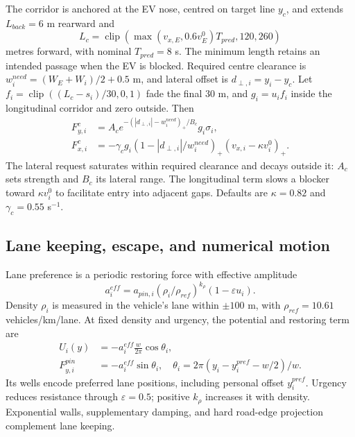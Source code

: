 \documentclass[conference,a4paper]{IEEEtran}
\newcommand{\pos}[1]{\left(#1\right)_+}
\newcommand{\clip}{\operatorname{clip}}
\begin{document}
The corridor is anchored at the EV nose, centred on target line $y_c$, and extends $L_{back}=6$ m rearward and
\begin{equation}
L_c=\clip(\max(v_{x,E},0.6v_E^0)T_{pred},120,260)
\end{equation}
metres forward, with nominal $T_{pred}=8$ s. The minimum length retains an intended passage when the EV is blocked. Required centre clearance is $w_i^{need}=(W_E+W_i)/2+0.5$ m, and lateral offset is $d_{\perp,i}=y_i-y_c$. Let $f_i=\clip((L_c-s_i)/30,0,1)$ fade the final 30 m, and $g_i=u_if_i$ inside the longitudinal corridor and zero outside. Then
\begin{align}
F^c_{y,i}&=A_c e^{-\pos{|d_{\perp,i}|-w_i^{need}}/B_c}g_i\sigma_i,
\label{eq:corrlat}\\
F^c_{x,i}&=-\gamma_c g_i
\pos{1-|d_{\perp,i}|/w_i^{need}}\pos{v_{x,i}-\kappa v_i^0}.
\end{align}
The lateral request saturates within required clearance and decays outside it: $A_c$ sets strength and $B_c$ its lateral range. The longitudinal term slows a blocker toward $\kappa v_i^0$ to facilitate entry into adjacent gaps. Defaults are $\kappa=0.82$ and $\gamma_c=0.55$ s$^{-1}$.

\subsection{Lane keeping, escape, and numerical motion}
Lane preference is a periodic restoring force with effective amplitude
\begin{equation}
a_i^{eff}=a_{pin,i}(\rho_i/\rho_{ref})^{k_\rho}(1-\varepsilon u_i).
\label{eq:barrier}
\end{equation}
Density $\rho_i$ is measured in the vehicle's lane within $\pm100$ m, with $\rho_{ref}=10.61$ vehicles/km/lane. At fixed density and urgency, the potential and restoring term are
\begin{align}
U_i(y)&=-a_i^{eff}\frac{w}{2\pi}\cos\theta_i,\\
F^{pin}_{y,i}&=-a_i^{eff}\sin\theta_i,\quad
\theta_i=2\pi(y_i-y_i^{pref}-w/2)/w.
\end{align}
Its wells encode preferred lane positions, including personal offset $y_i^{pref}$. Urgency reduces resistance through $\varepsilon=0.5$; positive $k_\rho$ increases it with density. Exponential walls, supplementary damping, and hard road-edge projection complement lane keeping.
\end{document}
